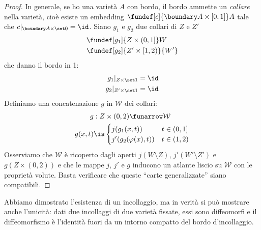 \begin{proof}
	In generale, se ho una varietà $A$ con bordo, il bordo ammette un \emph{collare} nella varietà, cioè esiste un embedding $\fundef[c]{\boundary A\times[0,1]}A$ tale che $c|_{\boundary A\times\set0}=\id$.
	Siano $g_1$ e $g_2$ due collari di $Z$ e $Z'$
	\begin{align*}
		&\fundef[g_1]{Z\times(0,1]}W\\
		&\fundef[g_2]{Z'\times[1,2)}{W'}
	\end{align*}
	che danno il bordo in 1:
	\begin{align*}
		g_1|_{Z\times\set1}&=\id\\
		g_2|_{Z'\times\set1}&=\id
	\end{align*}
	Definiamo una concatenazione $g$ in $\mathcal W$ dei collari:
	\begin{align*}
		g&:Z\times(0,2)\funarrow\mathcal W \\
		g(x,t)&\is\begin{cases}
			j(g_1(x,t)) & t\in(0,1] \\
			j'(g_2(\varphi(x),t)) & t\in(1,2)
		\end{cases}
	\end{align*}
	Osserviamo che $\mathcal W$ è ricoperto dagli aperti $j(W\setminus Z)$, $j'(W'\setminus Z')$ e $g(Z\times(0,2))$ e che le mappe $j$, $j'$ e $g$ inducono un atlante liscio su $\mathcal W$ con le proprietà volute. Basta verificare che queste ``carte generalizzate'' siano compatibili.
\end{proof}

\begin{oss}
	Abbiamo dimostrato l'esistenza di un incollaggio, ma in verità si può mostrare anche l'unicità: dati due incollaggi di due varietà fissate, essi sono diffeomorfi e il diffeomorfismo è l'identità fuori da un intorno compatto del bordo d'incollaggio.
\end{oss}

